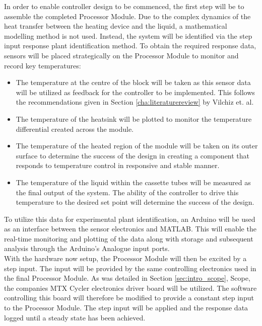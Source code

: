 In order to enable controller design to be commenced, the first step will be to assemble the completed Processor Module. Due to the complex dynamics of the heat transfer between the heating device and the liquid, a mathematical modelling method is not used. Instead, the system will be identified via the step input response plant identification method. To obtain the required response data, sensors will be placed strategically on the Processor Module to monitor and record key temperatures:
\begin{itemize}
	\item The temperature at the centre of the block will be taken as this sensor data will be utilized as feedback for the controller to be implemented. This follows the recommendations given in Section \ref{cha:literaturereview} by Vilchiz et. al.
	\item The temperature of the heatsink will be plotted to monitor the temperature differential created across the module.
	\item The temperature of the heated region of the module will be taken on its outer surface to determine the success of the design in creating a component that responds to temperature control in responsive and stable manner.
	\item The temperature of the liquid within the cassette tubes will be measured as the final output of the system. The ability of the controller to drive this temperature to the desired set point will determine the success of the design.
\end{itemize}

To utilize this data for experimental plant identification, an Arduino will be used as an interface between the sensor electronics and MATLAB. This will enable the real-time monitoring and plotting of the data along with storage and subsequent analysis through the Arduino's Analogue input ports.\\

With the hardware now setup, the Processor Module will then be excited by a step input. The input will be provided by the same controlling electronics used in the final Processor Module. As was detailed in Section \ref{sec:intro_scope}, Scope, the companies MTX Cycler electronics driver board will be utilized. The software controlling this board will therefore be modified to provide a constant step input to the Processor Module. The step input will be applied and the response data logged until a steady state has been achieved.\\

